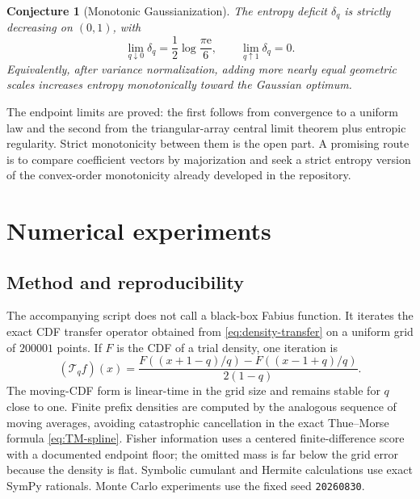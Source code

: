 \documentclass[11pt,oneside]{article}
\newtheorem{conjecture}[theorem]{Conjecture}
\theoremstyle{definition}
\theoremstyle{remark}
\newcommand{\e}{\mathrm e}
\begin{document}
\begin{conjecture}[Monotonic Gaussianization]
\label{conj:deficit-monotone}
The entropy deficit $\delta_q$ is strictly decreasing on $(0,1)$, with
\begin{equation}
 \lim_{q\downarrow0}\delta_q=\frac12\log\frac{\pi\e}{6},
 \qquad
 \lim_{q\uparrow1}\delta_q=0.
 \label{eq:deficit-endpoints}
\end{equation}
Equivalently, after variance normalization, adding more nearly equal geometric
scales increases entropy monotonically toward the Gaussian optimum.
\end{conjecture}

The endpoint limits are proved: the first follows from convergence to a uniform
law and the second from the triangular-array central limit theorem plus entropic
regularity.  Strict monotonicity between them is the open part.  A promising route
is to compare coefficient vectors by majorization and seek a strict entropy
version of the convex-order monotonicity already developed in the repository.

\section{Numerical experiments}
\label{sec:numerics}

\subsection{Method and reproducibility}

The accompanying script  does not call a black-box Fabius
function.  It iterates the exact CDF transfer operator obtained from
\eqref{eq:density-transfer} on a uniform grid of $200001$ points.  If $F$ is the
CDF of a trial density, one iteration is
\begin{equation}
 (\mathcal T_qf)(x)
 =\frac{F((x+1-q)/q)-F((x-1+q)/q)}{2(1-q)}.
 \label{eq:numerical-transfer}
\end{equation}
The moving-CDF form is linear-time in the grid size and remains stable for
$q$ close to one.  Finite prefix densities are computed by the analogous sequence
of moving averages, avoiding catastrophic cancellation in the exact
Thue--Morse formula \eqref{eq:TM-spline}.  Fisher information uses a centered
finite-difference score with a documented endpoint floor; the omitted mass is far
below the grid error because the density is flat.  Symbolic cumulant and Hermite
calculations use exact SymPy rationals.  Monte Carlo experiments use the fixed seed
\texttt{20260830}.
\end{document}
